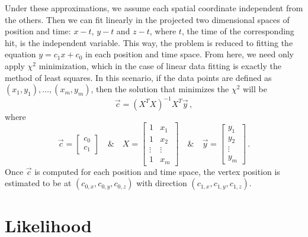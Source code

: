 Under these approximations, we assume each spatial coordinate independent from the others. Then we can fit linearly in the projected two dimensional spaces of position and time: $x-t$, $y-t$ and $z-t$, where $t$, the time of the corresponding hit, is the independent variable. This way, the problem is reduced to fitting the equation $y=c_{1}x + c_{0}$ in each position and time space. From here, we need only apply $\chi^{2}$ minimization, which in the case of linear data fitting is exactly the method of least squares. In this scenario, if the data points are defined as $(x_{1},y_{1}), \dots, (x_{m},y_{m})$, then the solution that minimizes the $\chi^{2}$ will be
\begin{equation}
  \vec{c} = (X^{T}X)^{-1}X^{T}\vec{y}\, ,
\end{equation}
where
\begin{equation}
  \vec{c} =
  \begin{bmatrix}
    c_{0} \\
    c_{1}
  \end{bmatrix}
  \quad \& \quad
  X =
  \begin{bmatrix}
    1 & x_{1} \\
    1 & x_{2} \\
    \vdots & \vdots \\
    1 & x_{m}
  \end{bmatrix}
  \quad \& \quad
  \vec{y} = 
  \begin{bmatrix}
    y_{1} \\
    y_{2} \\
    \vdots \\
    y_{m}
  \end{bmatrix}\, .
\end{equation}
Once $\vec{c}$ is computed for each position and time space, the vertex position is estimated to be at $(c_{0,x}, c_{0,y}, c_{0,z})$ with direction $(c_{1,x}, c_{1,y}, c_{1,z})$. 

\section{Likelihood}


